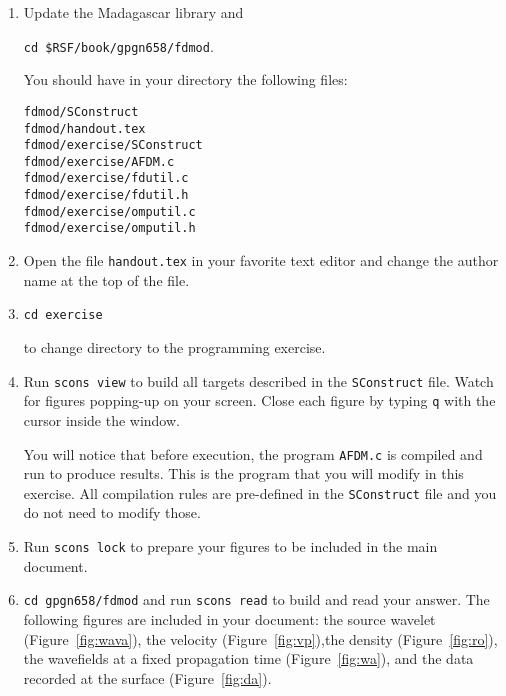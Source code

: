 \begin{enumerate}

\item Update the Madagascar library and 

\texttt{cd \$RSF/book/gpgn658/fdmod}.

You should have in your directory the
following files:

\texttt{fdmod/SConstruct} \\
\texttt{fdmod/handout.tex} \\
\texttt{fdmod/exercise/SConstruct} \\
\texttt{fdmod/exercise/AFDM.c} \\
\texttt{fdmod/exercise/fdutil.c} \\
\texttt{fdmod/exercise/fdutil.h} \\
\texttt{fdmod/exercise/omputil.c} \\
\texttt{fdmod/exercise/omputil.h}

\item 
Open the file \texttt{handout.tex} in your favorite text editor and
change the author name at the top of the file.

\item 
\texttt{cd exercise} \par
to change directory to the programming exercise.

\item 
Run \texttt{scons view} to build all targets described in the
\texttt{SConstruct} file. Watch for figures popping-up on your screen.
Close each figure by typing \texttt{q} with the cursor inside the
window.

You will notice that before execution, the program \texttt{AFDM.c} is
compiled and run to produce results. This is the program that you will
modify in this exercise. All compilation rules are pre-defined in the
\texttt{SConstruct} file and you do not need to modify those.

\item
Run \texttt{scons lock} to prepare your figures to be included in the
main document.

\item 
\texttt{cd gpgn658/fdmod} and run \texttt{scons read} to build and 
read your answer. The following figures are included in your document:
the source wavelet (Figure~\ref{fig:wava}), the velocity
(Figure~\ref{fig:vp}),the density (Figure~\ref{fig:ro}), the
wavefields at a fixed propagation time (Figure~\ref{fig:wa}), and the
data recorded at the surface (Figure~\ref{fig:da}).


\end{enumerate}
